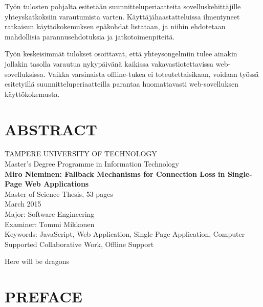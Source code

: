 Työn tulosten pohjalta esitetään suunnitteluperiaatteita sovelluskehittäjille yh\-te\-ys\-kat\-kok\-siin varautumista varten. Käyttäjähaastatteluissa ilmentyneet ratkaisun käyttökokemuksen epäkohdat listataan, ja niihin ehdotetaan mahdollisia parannusehdotuksia ja jatkotoimenpiteitä.

Työn keskeisimmät tulokset osoittavat, että yhteysongelmiin tulee ainakin jollakin tasolla varautua nykypäivänä kaikissa vakavastiotettavissa web-sovelluksissa. Vaikka varsinaista offline-tukea ei toteutettaisikaan, voidaan työssä esitetyillä suunnitteluperiaatteilla parantaa huomattavasti web-sovelluksen käyttökokemusta.






\newpage
\chapter*{ABSTRACT}
\begin{spacing}{1.0}
\textsf{TAMPERE UNIVERSITY OF TECHNOLOGY}\\
\textsf{Master's Degree Programme in Information Technology}\\
{\bf \textsf{Miro Nieminen: Fallback Mechanisms for Connection Loss in Single-Page Web Applications}}\\
\textsf{Master of Science Thesis, 53 pages}\\
\textsf{March 2015}\\
\textsf{Major: Software Engineering}\\
\textsf{Examiner: Tommi Mikkonen}\\
\textsf{Keywords: JavaScript, Web Application, Single-Page Application, Computer Supported Collaborative Work, Offline Support}\\
\end{spacing}
 
\noindent
Here will be dragons
 
\noindent

\noindent

\noindent






\newpage
 
\chapter*{PREFACE}
\noindent 

